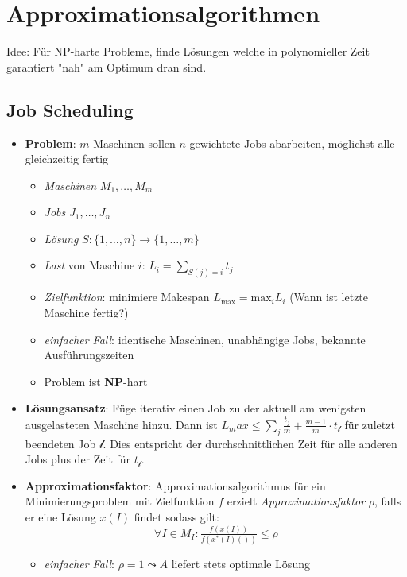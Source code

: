 \chapter{Approximationsalgorithmen}

Idee: Für NP-harte Probleme, finde Lösungen welche in polynomieller Zeit garantiert "nah" am Optimum dran sind.


\section{Job Scheduling}

\begin{itemize}
  \item \textbf{Problem}: $ m $ Maschinen sollen $ n $ gewichtete Jobs abarbeiten, möglichst alle gleichzeitig fertig
  \begin{itemize}
    \item \emph{Maschinen} $ M_1, \dots, M_m $
    \item \emph{Jobs} $ J_1, \dots, J_n $
    \item \emph{Lösung} $ S: \{ 1,\dots,n \} \to \{ 1,\dots,m \} $
    \item \emph{Last} von Maschine $ i $: $ L_i = \sum_{S(j) = i}t_j $
    \item \emph{Zielfunktion}: minimiere Makespan $ L_\text{max} = \text{max}_iL_i $ (Wann ist letzte Maschine fertig?)
    \item \emph{einfacher Fall}: identische Maschinen, unabhängige Jobs, bekannte Ausführungszeiten
    \item Problem ist \textbf{NP}-hart
  \end{itemize}
  \item \textbf{Lösungsansatz}: Füge iterativ einen Job zu der aktuell am wenigsten ausgelasteten Maschine hinzu. Dann ist $L_max \leq \sum_j \frac{t_j}{m} + \frac{m-1}{m}\cdot t_\mathcal{l}$ für zuletzt beendeten Job $\mathcal{l}$. Dies entspricht der durchschnittlichen Zeit für alle anderen Jobs plus der Zeit für $t_\mathcal{l}$.
  \item \textbf{Approximationsfaktor}: Approximationsalgorithmus für ein Minimierungsproblem mit Zielfunktion $ f $ erzielt \emph{Approximationsfaktor} $ \rho $, falls er eine Lösung $x(I)$ findet sodass gilt:
  \begin{equation*}
    \forall I \in M_I : \tfrac{f(x(I))}{f(x^\ast(I)())} \leq \rho
  \end{equation*}
  \begin{itemize}
    \item \emph{einfacher Fall}: $ \rho = 1 \leadsto A $ liefert stets optimale Lösung
  \end{itemize}
\end{itemize}

